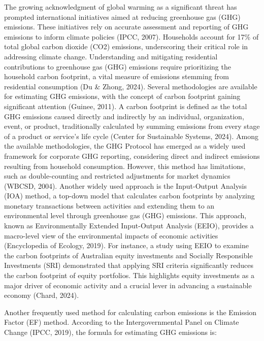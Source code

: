 \documentclass[12pt,a4paper]{article}
\begin{document}
The growing acknowledgment of global warming as a significant threat has prompted international initiatives aimed at reducing greenhouse gas (GHG) emissions. These initiatives rely on accurate assessment and reporting of GHG emissions to inform climate policies (IPCC, 2007). Households account for 17\% of total global carbon dioxide (CO2) emissions, underscoring their critical role in addressing climate change. Understanding and mitigating residential contributions to greenhouse gas (GHG) emissions require prioritizing the household carbon footprint, a vital measure of emissions stemming from residential consumption (Du \& Zhong, 2024). Several methodologies are available for estimating GHG emissions, with the concept of carbon footprint gaining significant attention (Guinee, 2011). A carbon footprint is defined as the total GHG emissions caused directly and indirectly by an individual, organization, event, or product, traditionally calculated by summing emissions from every stage of a product or service's life cycle (Center for Sustainable Systems, 2024). Among the available methodologies, the GHG Protocol has emerged as a widely used framework for corporate GHG reporting, considering direct and indirect emissions resulting from household consumption. However, this method has limitations, such as double-counting and restricted adjustments for market dynamics (WBCSD, 2004). 
\vspace{5 pt}
Another widely used approach is the Input-Output Analysis (IOA) method, a top-down model that calculates carbon footprints by analyzing monetary transactions between activities and extending them to an environmental level through greenhouse gas (GHG) emissions. This approach, known as Environmentally Extended Input-Output Analysis (EEIO), provides a macro-level view of the environmental impacts of economic activities (Encyclopedia of Ecology, 2019). For instance, a study using EEIO to examine the carbon footprints of Australian equity investments and Socially Responsible Investments (SRI) demonstrated that applying SRI criteria significantly reduces the carbon footprint of equity portfolios. This highlights equity investments as a major driver of economic activity and a crucial lever in advancing a sustainable economy (Chard, 2024).
\vspace{5 pt}

Another frequently used method for calculating carbon emissions is the Emission Factor (EF) method. According to the Intergovernmental Panel on Climate Change (IPCC, 2019), the formula for estimating GHG emissions is:
\end{document}
